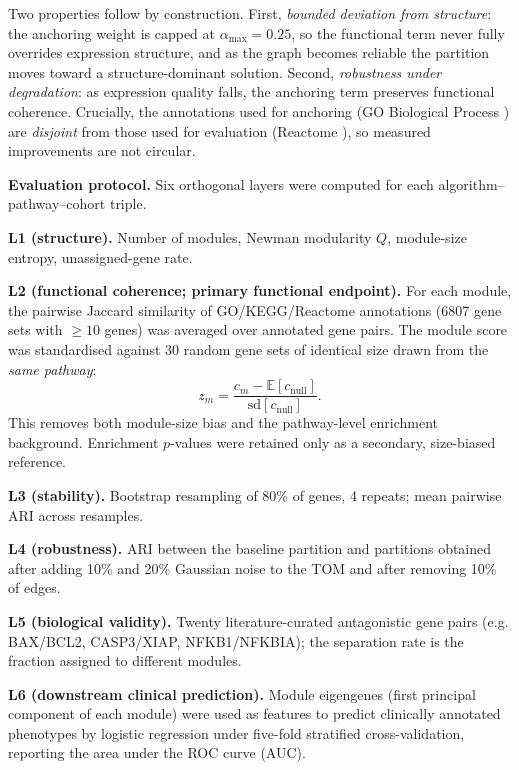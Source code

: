 \documentclass[twocolumn,10pt,a4paper]{article}
\begin{document}
Two properties follow by construction. First, \emph{bounded deviation from structure}: the
anchoring weight is capped at $\alpha_{\max}=0.25$, so the functional term never fully
overrides expression structure, and as the graph becomes reliable the partition moves toward a
structure-dominant solution. Second, \emph{robustness under degradation}: as expression quality falls, the
anchoring term preserves functional coherence. Crucially, the annotations used for anchoring
(GO Biological Process \citep{ashburner2000go}) are \emph{disjoint} from those used for
evaluation (Reactome \citep{jassal2020reactome}), so measured improvements are not circular.

\noindent\textbf{Evaluation protocol.} Six orthogonal layers were computed for each algorithm--pathway--cohort triple.

\noindent\textbf{L1 (structure).} Number of modules, Newman modularity $Q$, module-size
entropy, unassigned-gene rate.

\noindent\textbf{L2 (functional coherence; primary functional endpoint).} For each module,
the pairwise Jaccard similarity of GO/KEGG/Reactome annotations
\citep{ashburner2000go,jassal2020reactome}
(6807 gene sets with $\geq 10$ genes) was averaged over annotated gene pairs. The module score was standardised
against 30 random gene sets of identical size drawn from the \emph{same pathway}:
\begin{equation}
z_m = \frac{c_m - \mathbb{E}[c_{\mathrm{null}}]}{\mathrm{sd}[c_{\mathrm{null}}]}.
\end{equation}
This removes both module-size bias and the pathway-level enrichment background. Enrichment
$p$-values were retained only as a secondary, size-biased reference.

\noindent\textbf{L3 (stability).} Bootstrap resampling of 80\% of genes, 4 repeats; mean
pairwise ARI across resamples.

\noindent\textbf{L4 (robustness).} ARI between the baseline partition and partitions
obtained after adding 10\% and 20\% Gaussian noise to the TOM and after removing 10\% of
edges.

\noindent\textbf{L5 (biological validity).} Twenty literature-curated antagonistic gene
pairs (e.g. BAX/BCL2, CASP3/XIAP, NFKB1/NFKBIA); the separation rate is the fraction
assigned to different modules.

\noindent\textbf{L6 (downstream clinical prediction).} Module eigengenes (first principal
component of each module) were used as features to predict clinically annotated phenotypes
by logistic regression under five-fold stratified cross-validation, reporting the area
under the ROC curve (AUC).
\end{document}
